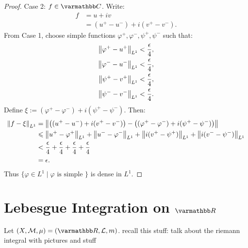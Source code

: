 \begin{proof}
        Case 2: $f \in \bfC$. Write:
            \begin{equation*}
            \begin{split}
                f 
                & = u+iv \\
                & = (u^+ - u^-) + i(v^+ - v^-).
            \end{split}
            \end{equation*} 
        From Case 1, choose simple functions $\varphi^+, \varphi^-, \psi^+,\psi^-$ such that:
            \begin{equation*}
            \begin{split}
                \left\lVert \varphi^+ - u^+ \right\rVert_{L^1} &< \frac{\epsilon}{4}, \\
                \left\lVert \varphi^- - u^- \right\rVert_{L^1} &< \frac{\epsilon}{4}, \\
                \left\lVert \psi^+ - v^+ \right\rVert_{L^1} &< \frac{\epsilon}{4}, \\
                \left\lVert \psi^- - v^- \right\rVert_{L^1} &< \frac{\epsilon}{4}. \\
            \end{split}
            \end{equation*}
        Define $\xi := (\varphi^+ - \varphi^-) + i(\psi^+ - \psi^-)$. Then:
            \begin{equation*}
            \begin{split}
                \left\lVert f - \xi \right\rVert_{L^1}
                & = \left\lVert \bigl((u^+ - u^-) + i(v^+ - v^-)\bigr) - \bigl((\varphi^+ - \varphi^-) + i(\psi^+ - \psi^-)\bigr) \right\rVert \\
                & \leqslant \left\lVert u^+ - \varphi^+ \right\rVert_{L^1} + \left\lVert u^- -  \varphi^-  \right\rVert_{L^1} + \left\lVert i(v^+ - \psi^+ )  \right\rVert_{L^1} + \left\lVert i (v^- - \psi^- ) \right\rVert_{L^1} \\
                & < \frac{\epsilon}{4} + \frac{\epsilon}{4} + \frac{\epsilon}{4} + \frac{\epsilon}{4} \\
                & = \epsilon.
            \end{split}
            \end{equation*}
        Thus $\{\varphi \in L^1 \mid \varphi \text{ is simple }\}$ is dense in $L^1$.
    \end{proof}

\section{Lebesgue Integration on $\bfR$}
    Let $(X,\cM,\mu) = (\bfR,\cL,m)$. {\color{red} recall this stuff: talk about the riemann integral with pictures and stuff}


